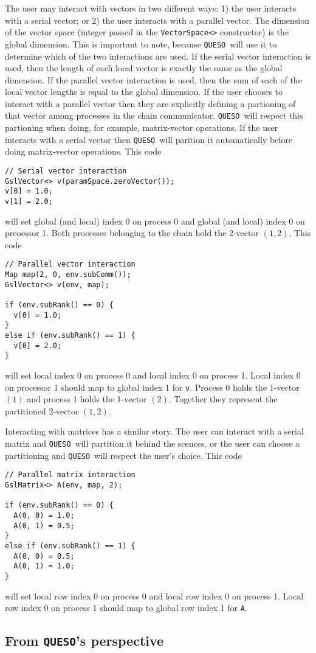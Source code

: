 \documentclass{article}
\newcommand{\Queso}{\texttt{QUESO}}
\begin{document}
The user may interact with vectors in two different ways: 1) the user interacts
with a serial vector; or 2) the user interacts with a parallel vector.  The
dimension of the vector space (integer passed in the \lstinline|VectorSpace<>|
constructor) is the global dimension.  This is important to note, because
\Queso\ will use it to determine which of the two interactions are used.
If the serial vector interaction is used, then the length of each local vector
is exactly the same as the global dimension.  If the parallel vector
interaction is used, then the sum of each of the local vector lengths is equal
to the global dimension.  If the user chooses to interact with a parallel
vector then they are explicitly defining a partioning of that vector among
processes in the chain communicator.  \Queso\ will respect this partioning
when doing, for example, matrix-vector operations.  If the user interacts with
a serial vector then \Queso\ will parition it automatically before doing
matrix-vector operations.  This code
\begin{lstlisting}
// Serial vector interaction
GslVector<> v(paramSpace.zeroVector());
v[0] = 1.0;
v[1] = 2.0;
\end{lstlisting}
will set global (and local) index 0 on process 0 and global (and local) index 0
on prcoessor 1.  Both processes belonging to the chain hold the 2-vector
$(1, 2)$.  This code
\begin{lstlisting}
// Parallel vector interaction
Map map(2, 0, env.subComm());
GslVector<> v(env, map);

if (env.subRank() == 0) {
  v[0] = 1.0;
}
else if (env.subRank() == 1) {
  v[0] = 2.0;
}
\end{lstlisting}
will set local index 0 on process 0 and local index 0 on process 1.  Local
index 0 on processor 1 should map to global index 1 for \lstinline|v|.  Process
0 holds the 1-vector $(1)$ and process 1 holds the 1-vector $(2)$.  Together
they represent the partitioned 2-vector $(1, 2)$.

Interacting with matrices has a similar story.  The user can interact with a
serial matrix and \Queso\ will partition it behind the scences, or the user
can choose a partitioning and \Queso\ will respect the user's choice.  This
code
\begin{lstlisting}
// Parallel matrix interaction
GslMatrix<> A(env, map, 2);

if (env.subRank() == 0) {
  A(0, 0) = 1.0;
  A(0, 1) = 0.5;
}
else if (env.subRank() == 1) {
  A(0, 0) = 0.5;
  A(0, 1) = 1.0;
}
\end{lstlisting}
will set local row index 0 on process 0 and local row index 0 on process 1.
Local row index 0 on process 1 should map to global row index 1 for
\lstinline|A|.

\subsection{From \Queso's perspective}
\end{document}

